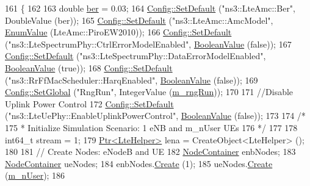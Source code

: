 \begin{DoxyCode}
161 \{
162   
163   \textcolor{keywordtype}{double} \hyperlink{lte__cqi__generation_8m_a197619a3539acfc577325d6e41b6ce95}{ber} = 0.03;
164   \hyperlink{group__config_ga2e7882df849d8ba4aaad31c934c40c06}{Config::SetDefault} (\textcolor{stringliteral}{"ns3::LteAmc::Ber"}, DoubleValue (ber));
165   \hyperlink{group__config_ga2e7882df849d8ba4aaad31c934c40c06}{Config::SetDefault} (\textcolor{stringliteral}{"ns3::LteAmc::AmcModel"}, \hyperlink{classns3_1_1EnumValue}{EnumValue} (LteAmc::PiroEW2010));
166   \hyperlink{group__config_ga2e7882df849d8ba4aaad31c934c40c06}{Config::SetDefault} (\textcolor{stringliteral}{"ns3::LteSpectrumPhy::CtrlErrorModelEnabled"}, 
      \hyperlink{classns3_1_1BooleanValue}{BooleanValue} (\textcolor{keyword}{false}));
167   \hyperlink{group__config_ga2e7882df849d8ba4aaad31c934c40c06}{Config::SetDefault} (\textcolor{stringliteral}{"ns3::LteSpectrumPhy::DataErrorModelEnabled"}, 
      \hyperlink{classns3_1_1BooleanValue}{BooleanValue} (\textcolor{keyword}{true}));
168   \hyperlink{group__config_ga2e7882df849d8ba4aaad31c934c40c06}{Config::SetDefault} (\textcolor{stringliteral}{"ns3::RrFfMacScheduler::HarqEnabled"}, 
      \hyperlink{classns3_1_1BooleanValue}{BooleanValue} (\textcolor{keyword}{false}));
169   \hyperlink{group__config_ga0e12663a7bd119b65d0a219a578f2a3c}{Config::SetGlobal} (\textcolor{stringliteral}{"RngRun"}, IntegerValue (\hyperlink{classLenaDataPhyErrorModelTestCase_a6735963eff8c54a2551a0f7c0f951a8d}{m\_rngRun}));
170 
171   \textcolor{comment}{//Disable Uplink Power Control}
172   \hyperlink{group__config_ga2e7882df849d8ba4aaad31c934c40c06}{Config::SetDefault} (\textcolor{stringliteral}{"ns3::LteUePhy::EnableUplinkPowerControl"}, 
      \hyperlink{classns3_1_1BooleanValue}{BooleanValue} (\textcolor{keyword}{false}));
173 
174   \textcolor{comment}{/*}
175 \textcolor{comment}{   * Initialize Simulation Scenario: 1 eNB and m\_nUser UEs}
176 \textcolor{comment}{   */}
177 
178   int64\_t stream = 1;
179   \hyperlink{classns3_1_1Ptr}{Ptr<LteHelper>} lena = CreateObject<LteHelper> ();
180   
181   \textcolor{comment}{// Create Nodes: eNodeB and UE}
182   \hyperlink{classns3_1_1NodeContainer}{NodeContainer} enbNodes;
183   \hyperlink{classns3_1_1NodeContainer}{NodeContainer} ueNodes;
184   enbNodes.\hyperlink{classns3_1_1NodeContainer_a787f059e2813e8b951cc6914d11dfe69}{Create} (1);
185   ueNodes.\hyperlink{classns3_1_1NodeContainer_a787f059e2813e8b951cc6914d11dfe69}{Create} (\hyperlink{classLenaDataPhyErrorModelTestCase_a7d8a550f6403ea7a365759bbbffbacb4}{m\_nUser});
186 

\end{DoxyCode}
